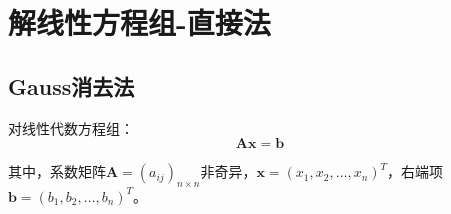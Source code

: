 




% 

\chapter{解线性方程组-直接法}

\section{Gauss消去法}

对线性代数方程组：
\begin{equation*}
    \boldsymbol{Ax} = \boldsymbol{b}
\end{equation*}

其中，系数矩阵$\boldsymbol{A} = (a_{ij})_{n\times n}$非奇异，$\boldsymbol{x}=(x_1,x_2,\dots,x_n)^{T}$，右端项$\boldsymbol{b}=(b_1,b_2,\dots,b_n)^T$。

